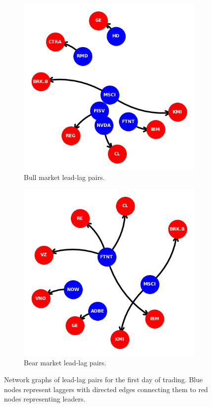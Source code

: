 \documentclass{article}
\begin{document}
\begin{figure}[H]
    \centering
    \begin{subfigure}{0.45\textwidth}
        \centering
        \includegraphics[width=\linewidth]{bullNetwork.png}
        \caption{Bull market lead-lag pairs.}
        \label{fig:bullNetwork}
    \end{subfigure}
    \hfill
    \begin{subfigure}{0.45\textwidth}
        \centering
        \includegraphics[width=\linewidth]{bearNetwork.png}
        \caption{Bear market lead-lag pairs.}
        \label{fig:bearNetwork}
    \end{subfigure}
    \caption{Network graphs of lead-lag pairs for the first day of trading. Blue nodes represent laggers with directed edges connecting them to red nodes representing leaders.}
    \label{fig:networks}
\end{figure}
\end{document}
